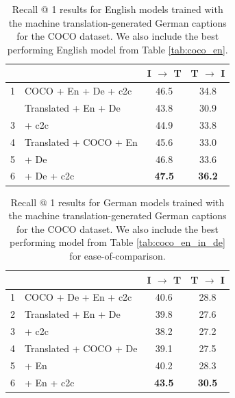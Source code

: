 \begin{table}[]
    \centering
    \renewcommand{\arraystretch}{1.0}
    \begin{tabular}{rlcc}
        \toprule         
        & & I $\rightarrow$ T & T $\rightarrow$ I \\
         \midrule
         1 & COCO + En + De + c2c & 46.5 & 34.8 \\         
         \hdashline
         2 & Translated + En + De & 43.8 & 30.9 \\
         3 & \; + c2c & 44.9 & 33.8 \\
         4 & Translated + COCO + En & 45.6 & 33.0 \\
         5 & \; + De & 46.8 & 33.6 \\
         6 & \; + De + c2c & \textbf{47.5} & \textbf{36.2} \\  
         \bottomrule
    \end{tabular}
    \caption{Recall @ 1 results for English models trained with the machine translation-generated German captions for the COCO dataset. We also include the best performing English model from Table \ref{tab:coco_en}.}\label{tab:coco_en-mt}
\end{table}

\begin{table}[]
    \centering
    \renewcommand{\arraystretch}{1.0}
    \begin{tabular}{rlcc}
        \toprule         
        & & I $\rightarrow$ T & T $\rightarrow$ I \\
        \midrule
        1 & COCO + De + En + c2c & 40.6 & 28.8 \\
         \hdashline
         2 & Translated + En + De & 39.8 & 27.6  \\
         3 & \; + c2c & 38.2 & 27.2\\
         4 & Translated + COCO + De & 39.1 & 27.5 \\
         5 & \; + En & 40.2 & 28.3 \\
         6 & \; + En + c2c & \textbf{43.5} & \textbf{30.5} \\         
         \bottomrule
    \end{tabular}
    \caption{Recall @ 1 results for German models trained with the machine translation-generated German captions for the COCO dataset. We also include the best performing model from Table \ref{tab:coco_en_in_de} for ease-of-comparison.}\label{tab:coco_de-mt}
\end{table}

